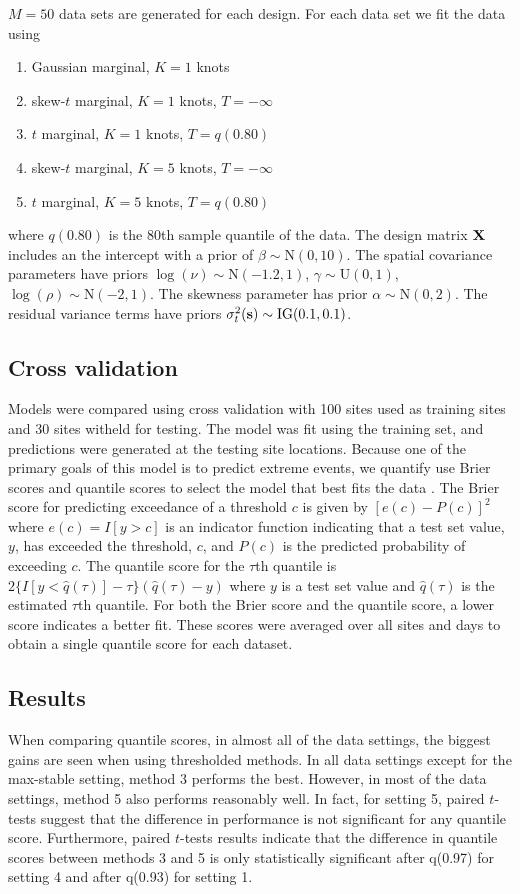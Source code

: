 \documentclass[11pt]{article}
\begin{document}
$M = 50$ data sets are generated for each design.
For each data set we fit the data using
\begin{enumerate} \setlength{\itemsep}{-0.5em}
  \item Gaussian marginal, $K=1$ knots
  \item skew-$t$ marginal, $K=1$ knots, $T=-\infty$
  \item $t$ marginal, $K=1$ knots, $T=q(0.80)$
  \item skew-$t$ marginal, $K=5$ knots, $T=-\infty$
  \item $t$ marginal, $K=5$ knots, $T=q(0.80)$
\end{enumerate}
where $q(0.80)$ is the 80th sample quantile of the data.
The design matrix $\mbox{\bf X}$ includes an the intercept with a prior of $\beta \sim \text{N}(0, 10)$.
The spatial covariance parameters have priors $\log(\nu) \sim \text{N}(-1.2, 1)$, $\gamma \sim \text{U}(0, 1)$, $\log(\rho) \sim \text{N}(-2, 1)$.
The skewness parameter has prior $\alpha \sim \text{N}(0, 2)$.
The residual variance terms have priors $\sigma^2_t(\mbox{\bf s}) \sim \text{IG}(0.1, 0.1)$.

\subsection{Cross validation}\label{s:modelselect}
Models were compared using cross validation with 100 sites used as training sites and 30 sites witheld for testing.
The model was fit using the training set, and predictions were generated at the testing site locations.
Because one of the primary goals of this model is to predict extreme events, we quantify use Brier scores and quantile scores to select the model that best fits the data \citep{Gneiting2007}.
The Brier score for predicting exceedance of a threshold $c$ is given by $[e(c) - P(c)]^2$ where $e(c) = I[y>c]$ is an indicator function indicating that a test set value, $y$, has exceeded the threshold, $c$, and $P(c)$ is the predicted probability of exceeding $c$.
The quantile score for the $\tau$th quantile is $2\{ I[y < \widehat{q}(\tau)] - \tau\} (\widehat{q}(\tau) - y)$ where $y$ is a test set value and $\widehat{q}(\tau)$ is the estimated $\tau$th quantile.
For both the Brier score and the quantile score, a lower score indicates a better fit.
These scores were averaged over all sites and days to obtain a single quantile score for each dataset.

\subsection{Results}\label{s:simresults}
When comparing quantile scores, in almost all of the data settings, the biggest gains are seen when using thresholded methods.
In all data settings except for the max-stable setting, method 3 performs the best.
However, in most of the data settings, method 5 also performs reasonably well.
In fact, for setting 5, paired $t$-tests suggest that the difference in performance is not significant for any quantile score.
Furthermore, paired $t$-tests results indicate that the difference in quantile scores between methods 3 and 5 is only statistically significant after q(0.97) for setting 4 and after q(0.93) for setting 1.
\end{document}
